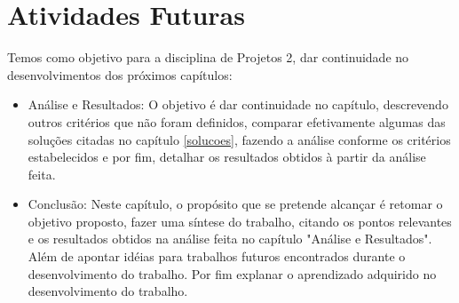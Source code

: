 \chapter{Atividades Futuras}
Temos como objetivo para a disciplina de Projetos 2, dar continuidade no desenvolvimentos dos próximos capítulos:

\begin{itemize}
    \item Análise e Resultados: O objetivo é dar continuidade no capítulo, descrevendo outros critérios que não foram definidos, comparar efetivamente algumas das soluções citadas no capítulo \ref{solucoes}, fazendo a análise conforme os critérios estabelecidos e por fim, detalhar os resultados obtidos à partir da análise feita.
    \item Conclusão: Neste capítulo, o propósito que se pretende alcançar é retomar o objetivo proposto, fazer uma síntese do trabalho, citando os pontos relevantes e os resultados obtidos na análise feita no capítulo "Análise e Resultados". Além de apontar idéias para trabalhos futuros encontrados durante o desenvolvimento do trabalho. Por fim explanar o aprendizado adquirido no desenvolvimento do trabalho.
\end{itemize}